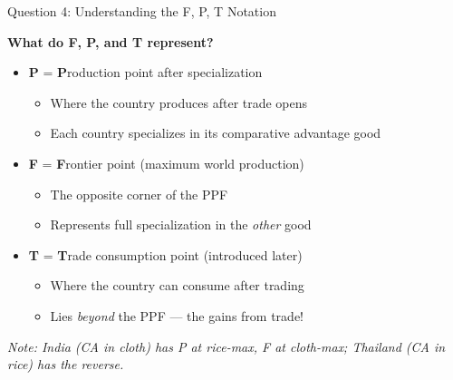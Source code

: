 \documentclass{beamer}
\begin{document}

\begin{frame}{Question 4: Understanding the F, P, T Notation}

\textbf{What do F, P, and T represent?}

\vspace{0.3cm}

\begin{itemize}
    \item \textbf{P} = \textbf{P}roduction point after specialization
    \begin{itemize}
        \item Where the country produces after trade opens
        \item Each country specializes in its comparative advantage good
    \end{itemize}
    
    \vspace{0.3cm}
    
    \item \textbf{F} = \textbf{F}rontier point (maximum world production)
    \begin{itemize}
        \item The opposite corner of the PPF
        \item Represents full specialization in the \textit{other} good
    \end{itemize}
    
    \vspace{0.3cm}
    
    \item \textbf{T} = \textbf{T}rade consumption point (introduced later)
    \begin{itemize}
        \item Where the country can consume after trading
        \item Lies \textit{beyond} the PPF --- the gains from trade!
    \end{itemize}
\end{itemize}

\vspace{0.3cm}

\small{\textit{Note: India (CA in cloth) has P at rice-max, F at cloth-max; Thailand (CA in rice) has the reverse.}}

\end{frame}
\end{document}
